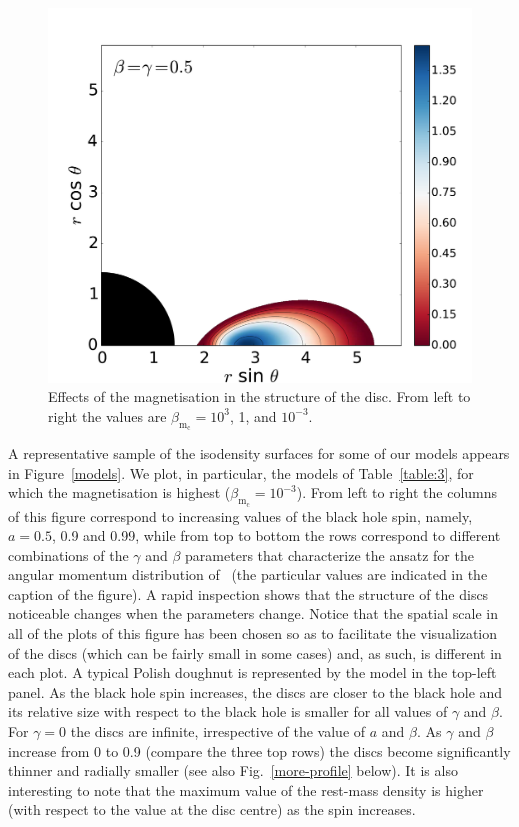 \documentclass{aa}
\begin{document}
\begin{figure}[t]
\includegraphics[scale=0.14]{figures/fig3c.pdf}
\caption{Effects of the magnetisation in the structure of the disc. From left to right the values are $\beta_{\mathrm{m}_{\mathrm{c}}}
=10^3$, 1, and $10^{-3}$.}
\label{magnetisation}%
\end{figure}

A representative sample of the isodensity surfaces for some of our models appears in Figure~\ref{models}. We plot, in particular, the models of Table~\ref{table:3}, for which the magnetisation is highest ($\beta_{\mathrm{m}_{\mathrm{c}}}=10^{-3}$). From left to right the columns of this figure correspond to increasing values of the black hole spin, namely, $a=0.5$, 0.9 and 0.99, while from top to bottom the rows correspond to different combinations of the $\gamma$ and $\beta$ parameters that characterize the ansatz for the angular momentum distribution of~\citet{Qian:2009} (the particular values are indicated in the caption of the figure).  A rapid inspection shows that the structure of the discs noticeable changes when the parameters change. Notice that the spatial scale in all of the plots of this figure has been chosen so as to facilitate the visualization of the discs (which can be fairly small in some cases) and, as such, is different in each plot. A typical Polish doughnut is represented by the model in the top-left panel. As the black hole spin increases, the discs are closer to the black hole and its relative size with respect to the black hole is smaller for all values of $\gamma$ and $\beta$. For $\gamma=0$ the discs are infinite, irrespective of the value of $a$ and $\beta$. As $\gamma$ and $\beta$ increase from 0 to 0.9 (compare the three top rows) the discs become significantly thinner and radially smaller (see also Fig.~\ref{more-profile} below). It is also interesting to note that the maximum value of the rest-mass density is higher (with respect to the value at the disc centre) as the spin increases.
\end{document}
